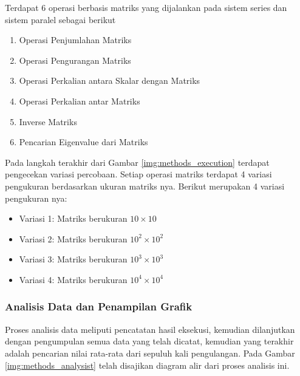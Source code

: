 Terdapat 6 operasi berbasis matriks yang dijalankan pada sistem series dan
sistem paralel sebagai berikut

\begin{enumerate}
  \item Operasi Penjumlahan Matriks
  \item Operasi Pengurangan Matriks
  \item Operasi Perkalian antara Skalar dengan Matriks
  \item Operasi Perkalian antar Matriks
  \item Inverse Matriks
  \item Pencarian Eigenvalue dari Matriks
\end{enumerate}

Pada langkah terakhir dari Gambar \ref{img:methods_execution} terdapat
pengecekan variasi percobaan. Setiap operasi matriks terdapat 4 variasi
pengukuran berdasarkan ukuran matriks nya. Berikut merupakan 4 variasi
pengukuran nya:

\begin{itemize}
  \item Variasi 1: Matriks berukuran $10 \times 10$
  \item Variasi 2: Matriks berukuran $10^2 \times 10^2$
  \item Variasi 3: Matriks berukuran $10^3 \times 10^3$
  \item Variasi 4: Matriks berukuran $10^4 \times 10^4$
\end{itemize}

\subsubsection{Analisis Data dan Penampilan Grafik}

Proses analisis data meliputi pencatatan hasil eksekusi, kemudian dilanjutkan
dengan pengumpulan semua data yang telah dicatat, kemudian yang terakhir adalah
pencarian nilai rata-rata dari sepuluh kali pengulangan. Pada Gambar
\ref{img:methods_analysist} telah disajikan diagram alir dari proses analisis
ini.

